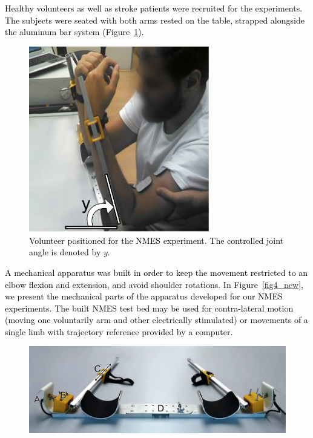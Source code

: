 \documentclass[review]{elsarticle}
\begin{document}
\textcolor{black}{
Healthy volunteers \textcolor{black}{as well as stroke patients} were recruited for the experiments. 
The subjects \textcolor{black}{were seated with both arms rested on the table, strapped alongside the aluminum bar system (Figure~\ref{fig4}).}
%
\begin{figure}[!htb]
\begin{center}
\includegraphics[width=0.7\textwidth]{fig4_new.pdf}
\caption{\textcolor{black}{Volunteer positioned for the NMES experiment. The controlled joint angle is denoted by $y$.}}
\label{fig4}
\end{center}
\end{figure}
%
%
A mechanical apparatus was built in order to keep the movement restricted to an elbow flexion and extension, and avoid shoulder rotations. In Figure~\ref{fig4_new}, we present the mechanical parts of the apparatus developed for our NMES experiments. The built NMES test bed may be used for contra-lateral motion (moving one voluntarily arm and other electrically stimulated) or movements of a single limb with trajectory reference provided by a computer. 
%
\begin{figure}[!htb]
\begin{center}
\includegraphics[width=1\textwidth]{aparatops.pdf}

\end{center}
\end{figure}}
\end{document}
